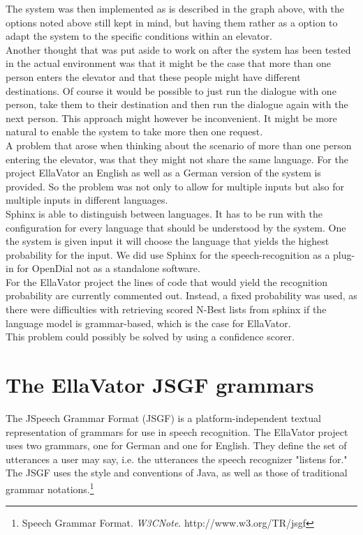 \documentclass[a4paper, 12pt]{article}
\begin{document}
The system was then implemented as is described in the graph above, with the options noted above still kept in mind, but having them rather as a option to adapt the system to the specific conditions within an elevator.\\

Another thought that was put aside to work on after the system has been tested in the actual environment was that it might be the case that more than one person enters the elevator and that these people might have different destinations.
Of course it would be possible to just run the dialogue with one person, take them to their destination and then run the dialogue again with the next person.
This approach might however be inconvenient.
It might be more natural to enable the system to take more then one request.\\


A problem that arose when thinking about the scenario of more than one person entering the elevator, was that they might not share the same language.
For the project EllaVator an English as well as a German version of the system is provided.
So the problem was not only to allow for multiple inputs but also for multiple inputs in different languages.\\
Sphinx is able to distinguish between languages. 
It has to be run with the configuration for every language that should be understood by the system.
One the system is given input it will choose the language that yields the highest probability for the input.
We did use Sphinx for the speech-recognition as a plug-in for OpenDial not as a
standalone software.\\
\newline
For the EllaVator project the lines of code that would yield the recognition probability are currently commented out.
Instead, a fixed probability was used, as there were difficulties with
retrieving scored N-Best lists from sphinx if the language model is grammar-based, which is the case for EllaVator.\\
This problem could possibly be solved by using a confidence scorer.


\newpage
\section{The EllaVator JSGF grammars}
The JSpeech Grammar Format (JSGF) is a platform-independent textual representation of grammars for use in speech recognition.
The EllaVator project uses two grammars, one for German and one for English.
They define the set of utterances a user may say, i.e. the utterances the speech recognizer "listens for."
The JSGF uses the style and conventions of Java, as well as those of traditional grammar notations.\footnote{ Speech Grammar Format. \textit{W3CNote}. http://www.w3.org/TR/jsgf}
\end{document}
